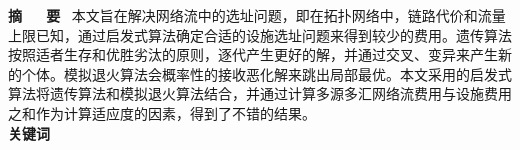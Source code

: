 \documentclass[a4paper,11pt,onecolumn,twoside]{article}
\title{\huge \heiti{基于遗传退火算法的网络流选址问题}}
\author{{\Large \fangsong 袁瑞} \\[2pt]
\footnotesize
（东南大学信息科学与工程学院，南京市~211189） \\[2pt]}
\date{}
\begin{document}
\newcommand{\supercite}[1]{\textsuperscript{\cite{#1}}}%
\maketitle

\setlength{\oddsidemargin}{1cm} %
\setlength{\evensidemargin}{\oddsidemargin}
\setlength{\textwidth}{13.50cm}
\vspace{-.8cm}
\begin{center}
	\parbox{\textwidth}
	{\textbf{摘~~~要} \quad ~{\kaishu 本文旨在解决网络流中的选址问题，即在拓扑网络中，链路代价和流量上限已知，通过启发式算法确定合适的设施选址问题来得到较少的费用。遗传算法按照适者生存和优胜劣汰的原则，逐代产生更好的解，并通过交叉、变异来产生新的个体。模拟退火算法会概率性的接收恶化解来跳出局部最优。本文采用的启发式算法将遗传算法和模拟退火算法结合，并通过计算多源多汇网络流费用与设施费用之和作为计算适应度的因素，得到了不错的结果。}\\
	\textbf{关键词} 
}
\end{center}

\vspace{.1cm}
\end{document}
